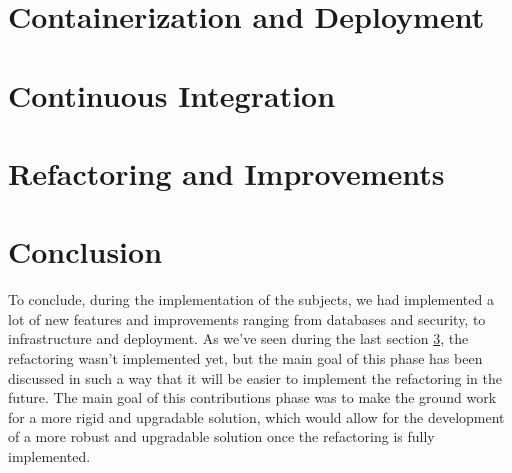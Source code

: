 \section {Containerization and Deployment}


\section {Continuous Integration}


\section {Refactoring and Improvements}\label{sec:refactoring}


\section {Conclusion}

To conclude, during the implementation of the subjects, we had implemented a lot of
new features and improvements ranging from databases and security, to infrastructure 
and deployment.
As we've seen during the last section \ref{sec:refactoring}, the refactoring wasn't 
implemented yet, but the main goal of this phase has been discussed in such a way
that it will be easier to implement the refactoring in the future.
The main goal of this contributions phase was to make the ground work for a more rigid
and upgradable solution, which would allow for the development of a more robust and
upgradable solution once the refactoring is fully implemented.

